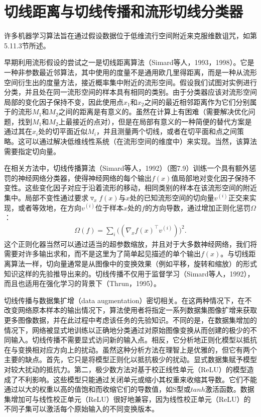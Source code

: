 \section{切线距离与切线传播和流形切线分类器}

许多机器学习算法旨在通过假设数据位于低维流行空间附近来克服维数诅咒，如第5.11.3节所述。

早期利用流形假设的尝试之一是切线距离算法（Simard等人，1993，1998）。它是一种非参数最近邻算法，其中使用的度量不是通用欧几里得距离，而是一种从流形空间衍生出的度量方法，接近概率集中附近的流形空间。假设我们试图对实例进行分类，并且处在同一流形空间的样本具有相同的类别。由于分类器应该对流形空间局部的变化因子保持不变，因此使用点$x_1$和$x_2$之间的最近相邻距离作为它们分别属于的流形$M_1$和$M_2$之间的距离是有意义的。虽然在计算上有困难（需要解决优化问题，找到$M_1$和$M_2$上最接近的点对），但是在局部有意义的一种简便的替代方案是通过其在$x_i$处的切平面近似$M_i$，并且测量两个切线，或者在切平面和点之间策略。这可以通过解决低维线性系统（在流形空间的维度中）来实现。当然，该算法需要指定切向量。

在相关方法中，切线传播算法（Simard等人，1992）（图7.9）训练一个具有额外惩罚的神经网络分类器，使得神经网络的每个输出$f(x)$值局部地对变化因子保持不变性。这些变化因子对应于沿着流形的移动，相同类别的样本在该流形空间的附近集中。局部不变性通过要求$\triangledown_x f(x)$与$x$处的已知流形空间的切向量$v^{(i)}$正交来实现，或者等效地，在方向$v^{(i)}$位于样本$x$处的$f$的方向导数，通过增加正则化惩罚$\Omega$：
$$
\begin{aligned} \label{eq:767}
\Omega(f) = \sum_i \Big((\nabla_{x} f(x)^\top v^{(i)}) \Big)^2 .
\end{aligned}
$$
这个正则化器当然可以通过适当的超参数缩放，并且对于大多数神经网络，我们将需要对许多输出求和，而不是这里为了简单起见描述的单个输出$f(x)$。与切线距离算法一样，切向量通常是从图像中的变换效果（例如平移，旋转和缩放）的形式知识这样的先验推导出来的。切线传播不仅用于监督学习（Simard等人，1992），而且也适用在强化学习的背景下（Thrun，1995）。

切线传播与数据集扩增（data augmentation）密切相关。在这两种情况下，在不改变网络原本样本的输出情况下，算法使用者将指定一系列数据集图像扩增来获取更多图像数据，并在此过程中考虑该任务的先验知识。不同的是，在数据集增加的情况下，网络被显式地训练以正确地分类通过对原始图像变换从而创建的极少的不同输入。切线传播不需要显式访问新的输入点。相反，它分析地正则化模型以抵抗在与变换相对应方向上的扰动。虽然这种分析方法在理智上是优雅的，但它有两个主要的缺点。首先，它只是将模型正则化以抵抗极少的扰动。显式数据集赋予模型对较大扰动的抵抗力。第二，极少数方法对基于校正线性单元（ReLU）的模型造成了不利影响。这些模型只能通过关闭单元或缩小其权重来收缩其导数。它们不能通过以大的权重以高的值饱和而收缩它们的导数值，如S型或$tanh$激活函数。数据集增加可与线性校正单元（ReLU）很好地兼容，因为线性校正单元（ReLU）的不同子集可以激活每个原始输入的不同变换版本。

